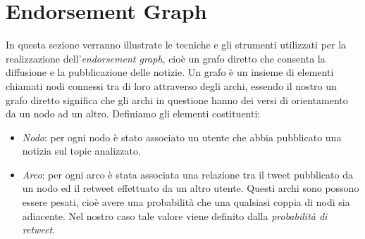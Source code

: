 \section{Endorsement Graph}
In questa sezione verranno illustrate le tecniche e gli strumenti utilizzati per la realizzazione dell'\textit{endorsement graph}, cioè un grafo diretto che consenta la diffusione e la pubblicazione delle notizie.
Un grafo è un insieme di elementi chiamati nodi connessi tra di loro attraverso degli archi, essendo il nostro un grafo diretto significa che gli archi in questione hanno dei versi di orientamento da un nodo ad un altro.
Definiamo gli elementi costituenti:
\begin{itemize}
\item \textit{Nodo}: per ogni nodo è stato associato un utente che abbia pubblicato una notizia sul topic analizzato.
\item \textit{Arco}: per ogni arco è stata associata una relazione tra il tweet pubblicato da un nodo ed il retweet effettuato da un altro utente. Questi archi sono possono essere pesati, cioè avere una probabilità che una qualsiasi coppia di nodi sia adiacente. Nel nostro caso tale valore viene definito dalla \textit{probabilità di retweet}.
\end{itemize}

